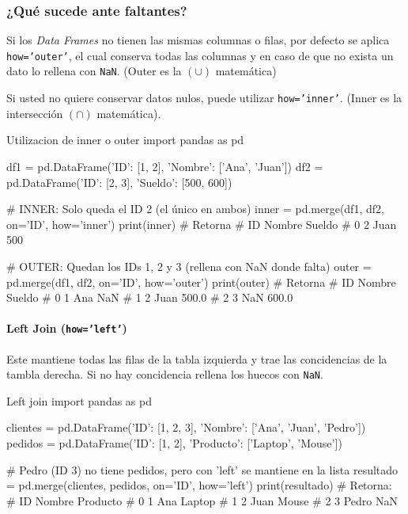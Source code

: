 \subsubsection{¿Qué sucede ante faltantes?}

Si los \textit{Data Frames} no tienen las mismas columnas o filas, por defecto se aplica \texttt{how='outer'}, el cual conserva todas las columnas y en caso de que no exista un dato lo rellena con \texttt{NaN}. (Outer es la \((\cup )\) matemática)

Si usted no quiere conservar datos nulos, puede utilizar \texttt{how='inner'}. (Inner es la intersección \((\cap)\) matemática).

\begin{pycode}{Utilizacion de inner o outer}
import pandas as pd

df1 = pd.DataFrame({'ID': [1, 2], 'Nombre': ['Ana', 'Juan']})
df2 = pd.DataFrame({'ID': [2, 3], 'Sueldo': [500, 600]})

# INNER: Solo queda el ID 2 (el único en ambos)
inner = pd.merge(df1, df2, on='ID', how='inner')
print(inner) # Retorna
#    ID Nombre  Sueldo
# 0   2   Juan     500

# OUTER: Quedan los IDs 1, 2 y 3 (rellena con NaN donde falta)
outer = pd.merge(df1, df2, on='ID', how='outer')
print(outer) # Retorna
#    ID Nombre  Sueldo
# 0   1    Ana     NaN
# 1   2   Juan   500.0
# 2   3    NaN   600.0  
\end{pycode}

\paragraph{Left Join (\texttt{how='left'})}

Este mantiene todas las filas de la tabla izquierda y trae las concidencias de la tambla derecha. Si no hay concidencia rellena los huecos con \texttt{NaN}.
\begin{pycode}{Left join}
import pandas as pd

clientes = pd.DataFrame({'ID': [1, 2, 3], 'Nombre': ['Ana', 'Juan', 'Pedro']})
pedidos = pd.DataFrame({'ID': [1, 2], 'Producto': ['Laptop', 'Mouse']})

# Pedro (ID 3) no tiene pedidos, pero con 'left' se mantiene en la lista
resultado = pd.merge(clientes, pedidos, on='ID', how='left')
print(resultado) # Retorna:
#    ID Nombre Producto
# 0   1    Ana   Laptop
# 1   2   Juan    Mouse
# 2   3  Pedro      NaN
\end{pycode}


